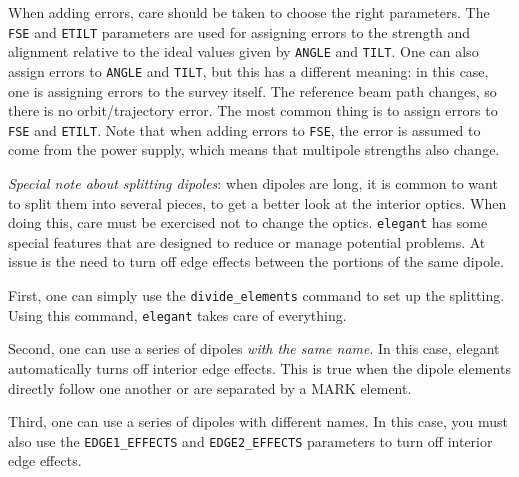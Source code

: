 When adding errors, care should be taken to choose the right
parameters.  The \verb|FSE| and \verb|ETILT| parameters are used for
assigning errors to the strength and alignment relative to the ideal
values given by \verb|ANGLE| and \verb|TILT|.  One can also assign 
errors to \verb|ANGLE| and \verb|TILT|, but this has a different meaning:
in this case, one is assigning errors to the survey itself.  The reference
beam path changes, so there is no orbit/trajectory error. The most common
thing is to assign errors to \verb|FSE| and \verb|ETILT|.  Note that when
adding errors to \verb|FSE|, the error is assumed to come from the power
supply, which means that multipole strengths also change.

{\em Special note about splitting dipoles}: when dipoles are long, it is
common to want to split them into several pieces, to get a better look
at the interior optics.  When doing this, care must be exercised not
to change the optics.  {\tt elegant} has some special features that
are designed to reduce or manage potential problems. At issue is the
need to turn off edge effects between the portions of the same dipole.

First, one can simply use the \verb|divide_elements| command to set up
the splitting.  Using this command, {\tt elegant} takes care of everything.

Second, one can use a series of dipoles {\em with the same name}.  In this case,
elegant automatically turns off interior edge effects.  This is true when the
dipole elements directly follow one another or are separated by a MARK element.

Third, one can use a series of dipoles with different names.  In this case, you
must also use the \verb|EDGE1_EFFECTS| and \verb|EDGE2_EFFECTS| parameters to
turn off interior edge effects.  

